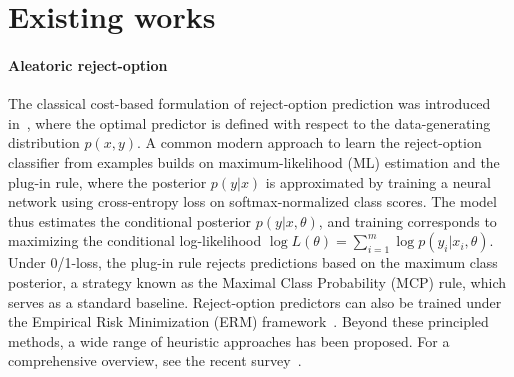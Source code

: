 \section{Existing works}

\paragraph{Aleatoric reject-option}
The classical cost-based formulation of reject-option prediction was introduced in~\cite{Chow-RejectOpt-TIT1970}, where the optimal predictor is defined with respect to the data-generating distribution $p(x, y)$. A common modern approach to learn the reject-option classifier from examples builds on maximum-likelihood (ML) estimation and the plug-in rule, where the posterior $p(y|x)$ is approximated by training a neural network using cross-entropy loss on softmax-normalized class scores. The model thus estimates the conditional posterior $p(y|x, \theta)$, and training corresponds to maximizing the conditional log-likelihood $\log L(\theta) = \sum_{i=1}^m \log p(y_i | x_i, \theta)$. Under 0/1-loss, the plug-in rule rejects predictions based on the maximum class posterior, a strategy known as the Maximal Class Probability (MCP) rule, which serves as a standard baseline. Reject-option predictors can also be trained under the Empirical Risk Minimization (ERM) framework~\cite{Yuan-ClassiRejOpt-JMLR2010}. Beyond these principled methods, a wide range of heuristic approaches has been proposed. For a comprehensive overview, see the recent survey~\cite{Hendrickx-MLwithRejectOpt-ML2024}.



